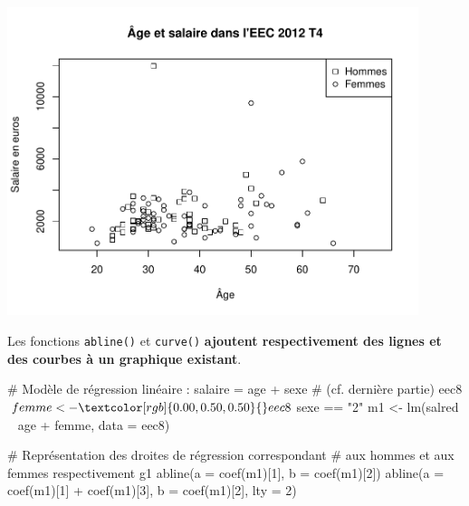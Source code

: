 \documentclass[12pt,twosided, notitlepage]{book}
\newenvironment{Shaded}{}{}
\newcommand{\CommentTok}[1]{\textcolor[rgb]{0.00,0.50,0.00}{#1}}
\newcommand{\DataTypeTok}[1]{#1}
\newcommand{\DecValTok}[1]{#1}
\newcommand{\KeywordTok}[1]{\textcolor[rgb]{0.00,0.00,1.00}{#1}}
\newcommand{\NormalTok}[1]{#1}
\newcommand{\OperatorTok}[1]{#1}
\newcommand{\StringTok}[1]{\textcolor[rgb]{0.00,0.50,0.50}{#1}}
\renewenvironment{Shaded}{\begin{snugshade}}{\end{snugshade}}
\begin{document}
\begin{center}\includegraphics[width=12cm]{livret_files/figure-latex/unnamed-chunk-438-1} \end{center}

Les fonctions \texttt{abline()} et
\texttt{curve()} \textbf{ajoutent
respectivement des lignes et des courbes à un graphique existant}.

\begin{Shaded}
\begin{Highlighting}[]
\CommentTok{# Modèle de régression linéaire : salaire = age + sexe}
\CommentTok{# (cf. dernière partie)}
\NormalTok{eec8}\OperatorTok{$}\NormalTok{femme <-}\StringTok{ }\NormalTok{eec8}\OperatorTok{$}\NormalTok{sexe }\OperatorTok{==}\StringTok{ "2"}
\NormalTok{m1 <-}\StringTok{ }\KeywordTok{lm}\NormalTok{(salred }\OperatorTok{~}\StringTok{ }\NormalTok{age }\OperatorTok{+}\StringTok{ }\NormalTok{femme, }\DataTypeTok{data =}\NormalTok{ eec8)}

\CommentTok{# Représentation des droites de régression correspondant}
\CommentTok{# aux hommes et aux femmes respectivement}
\NormalTok{g1}
\KeywordTok{abline}\NormalTok{(}\DataTypeTok{a =} \KeywordTok{coef}\NormalTok{(m1)[}\DecValTok{1}\NormalTok{], }\DataTypeTok{b =} \KeywordTok{coef}\NormalTok{(m1)[}\DecValTok{2}\NormalTok{])}
\KeywordTok{abline}\NormalTok{(}\DataTypeTok{a =} \KeywordTok{coef}\NormalTok{(m1)[}\DecValTok{1}\NormalTok{] }\OperatorTok{+}\StringTok{ }\KeywordTok{coef}\NormalTok{(m1)[}\DecValTok{3}\NormalTok{], }\DataTypeTok{b =} \KeywordTok{coef}\NormalTok{(m1)[}\DecValTok{2}\NormalTok{], }\DataTypeTok{lty =} \DecValTok{2}\NormalTok{)}
\end{Highlighting}
\end{Shaded}
\end{document}
